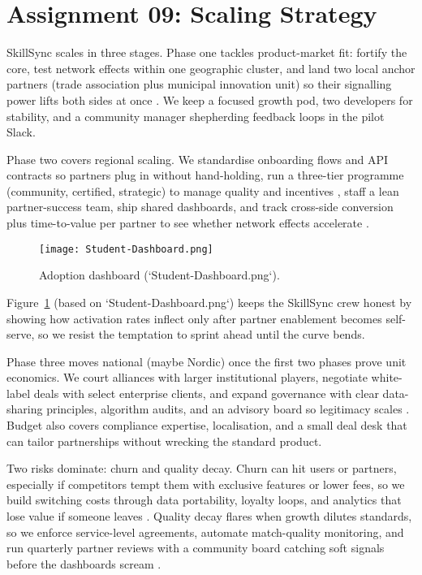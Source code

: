 \section*{Assignment 09: Scaling Strategy}

SkillSync scales in three stages. Phase one tackles product-market fit: fortify the core, test network effects within one geographic cluster, and land two local anchor partners (trade association plus municipal innovation unit) so their signalling power lifts both sides at once \citep{Choudary2016,Reillier2017}. We keep a focused growth pod, two developers for stability, and a community manager shepherding feedback loops in the pilot Slack.

Phase two covers regional scaling. We standardise onboarding flows and API contracts so partners plug in without hand-holding, run a three-tier programme (community, certified, strategic) to manage quality and incentives \citep{HagiuWright2013}, staff a lean partner-success team, ship shared dashboards, and track cross-side conversion plus time-to-value per partner to see whether network effects accelerate \citep{ShapiroVarian1999,Lecture12}.

\begin{figure}[h]
  \centering
  \texttt{[image: Student-Dashboard.png]}
  \caption{Adoption dashboard (`Student-Dashboard.png`).}
  \label{fig:scaling-dashboard}
\end{figure}

Figure~\ref{fig:scaling-dashboard} (based on `Student-Dashboard.png`) keeps the SkillSync crew honest by showing how activation rates inflect only after partner enablement becomes self-serve, so we resist the temptation to sprint ahead until the curve bends.

Phase three moves national (maybe Nordic) once the first two phases prove unit economics. We court alliances with larger institutional players, negotiate white-label deals with select enterprise clients, and expand governance with clear data-sharing principles, algorithm audits, and an advisory board so legitimacy scales \citep{Srnicek2017,Zuboff2019}. Budget also covers compliance expertise, localisation, and a small deal desk that can tailor partnerships without wrecking the standard product.

Two risks dominate: churn and quality decay. Churn can hit users or partners, especially if competitors tempt them with exclusive features or lower fees, so we build switching costs through data portability, loyalty loops, and analytics that lose value if someone leaves \citep{FarrellSaloner1986,ShapiroVarian1999}. Quality decay flares when growth dilutes standards, so we enforce service-level agreements, automate match-quality monitoring, and run quarterly partner reviews with a community board catching soft signals before the dashboards scream \citep{Reillier2017}.

